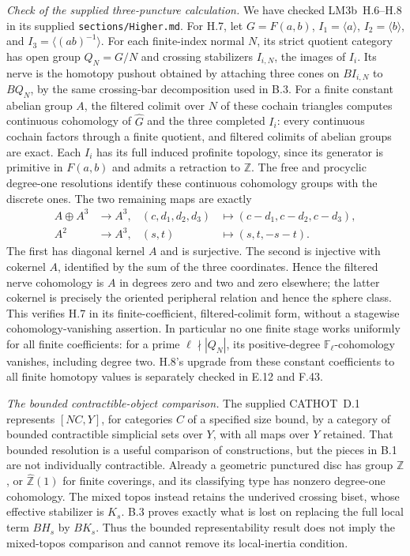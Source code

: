 \medskip
\noindent\emph{Check of the supplied three-puncture calculation.}
We have checked LM3b~H.6--H.8 in its supplied
\texttt{sections/Higher.md}. For H.7, let
$G=F(a,b)$, $I_1=\langle a\rangle$,
$I_2=\langle b\rangle$, and
$I_3=\langle(ab)^{-1}\rangle$.
For each finite-index normal $N$, its strict quotient category has
open group $Q_N=G/N$ and crossing stabilizers $I_{i,N}$, the images
of $I_i$. Its nerve is the homotopy pushout obtained by attaching
three cones on $BI_{i,N}$ to $BQ_N$, by the same crossing-bar
decomposition used in B.3. For a finite constant abelian group $A$,
the filtered colimit over $N$ of these cochain triangles computes
continuous cohomology of $\widehat G$ and the three completed
$I_i$: every continuous cochain factors through a finite quotient,
and filtered colimits of abelian groups are exact. Each $I_i$
has its full induced profinite topology, since its generator is
primitive in $F(a,b)$ and admits a retraction to $\mathbb Z$.
The free and procyclic degree-one resolutions identify these
continuous cohomology groups with the discrete ones. The two
remaining maps are exactly
\[
 \begin{aligned}
 A\oplus A^3&\longrightarrow A^3,&
 (c,d_1,d_2,d_3)&\longmapsto(c-d_1,c-d_2,c-d_3),\\
 A^2&\longrightarrow A^3,&(s,t)&\longmapsto(s,t,-s-t).
 \end{aligned}
\]
The first has diagonal kernel $A$ and is surjective. The second
is injective with cokernel $A$, identified by the sum of the three
coordinates. Hence the filtered nerve cohomology is $A$ in degrees
zero and two and zero elsewhere; the latter cokernel is precisely
the oriented peripheral relation and hence the sphere class.
This verifies H.7 in its finite-coefficient, filtered-colimit form,
without a stagewise cohomology-vanishing assertion. In particular
no one finite stage works uniformly for all finite coefficients:
for a prime $\ell\nmid|Q_N|$, its positive-degree
$\mathbb F_\ell$-cohomology vanishes, including degree two.
H.8's upgrade from these constant coefficients to all finite
homotopy values is separately checked in E.12 and F.43.

\medskip
\noindent\emph{The bounded contractible-object comparison.}
The supplied CATHOT~D.1 represents $[NC,Y]$, for categories $C$
of a specified size bound, by a category of bounded contractible
simplicial sets over $Y$, with all maps over $Y$ retained. That
bounded resolution is a useful comparison of constructions, but
the pieces in B.1 are not individually contractible. Already a
geometric punctured disc has group $\mathbb Z$, or
$\widehat{\mathbb Z}(1)$ for finite coverings, and its classifying
type has nonzero degree-one cohomology. The mixed topos instead
retains the underived crossing biset, whose effective stabilizer is
$K_s$. B.3 proves exactly what is lost on replacing the full local
term $BH_s$ by $BK_s$. Thus the bounded representability result
does not imply the mixed-topos comparison and cannot remove its
local-inertia condition.
